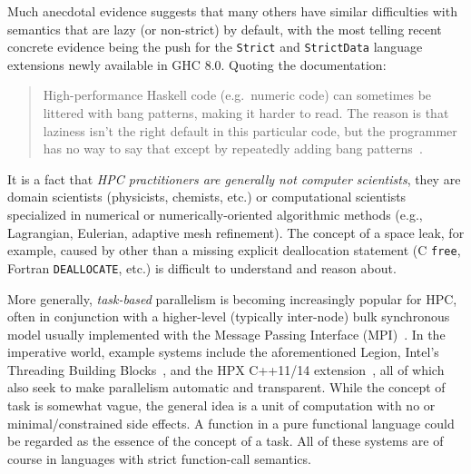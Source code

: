 \documentclass{llncs}
\begin{document}
Much anecdotal evidence suggests that many others have similar difficulties
with semantics that are lazy (or non-strict) by default, with the most telling
recent concrete evidence being the push for the \texttt{Strict} and
\texttt{StrictData} language extensions newly available in GHC 8.0.  Quoting
the documentation:
\begin{quote}
  High-performance Haskell code (e.g.\ numeric code) can sometimes be littered
  with bang patterns, making it harder to read. The reason is that laziness
  isn't the right default in this particular code, but the programmer has no
  way to say that except by repeatedly adding bang
  patterns~\cite{strict-strictdata}.
\end{quote}
It is a fact that \emph{HPC practitioners are generally not computer
  scientists}, they are domain scientists (physicists, chemists, etc.) or
computational scientists specialized in numerical or numerically-oriented
algorithmic methods (e.g., Lagrangian, Eulerian, adaptive mesh refinement).
The concept of a space leak, for example, caused by other than a missing
explicit deallocation statement (C \texttt{free}, Fortran \texttt{DEALLOCATE}, 
etc.) is difficult to understand and reason about.

More generally, \emph{task-based} parallelism is becoming increasingly popular
for HPC, often in conjunction with a higher-level (typically inter-node) bulk
synchronous model usually implemented with the Message Passing Interface
(MPI)~\cite{MPI}\@.  In the imperative world, example systems include the
aforementioned Legion, Intel's Threading Building Blocks~\cite{Reinders:2007},
and the HPX C++11/14 extension~\cite{HPX}, all of which also seek to
make parallelism automatic and transparent.  While the concept of task is
somewhat vague, the general idea is a unit of computation with no or
minimal/constrained side effects.  A function in a pure functional language
could be regarded as the essence of the concept of a task.  All of these
systems are of course in languages with strict function-call semantics.
\end{document}
